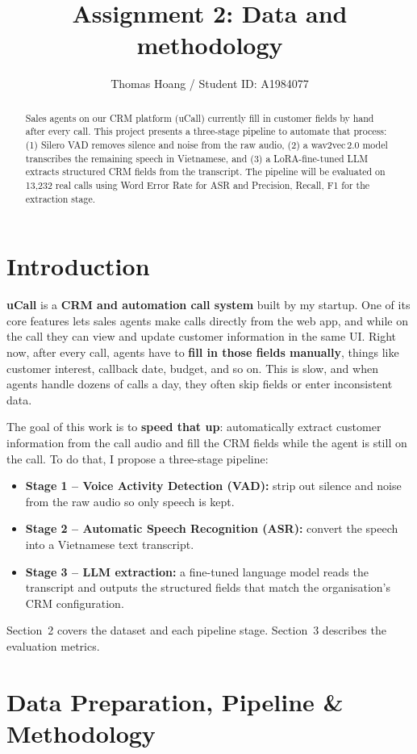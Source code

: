 \documentclass[ 
  journal=medium,
  manuscript={Contextual Information Extraction of Customer Data from Sales audio calls},
  year=2026,
  volume=0,
]{cup-journal}
\title{Assignment 2: Data and methodology}
\author{Thomas Hoang / Student ID: A1984077}
\begin{document}
\begin{abstract}
  Sales agents on our CRM platform (uCall) currently fill in customer fields by hand after every call. This project presents a three-stage pipeline to automate that process: (1) Silero VAD removes silence and noise from the raw audio, (2) a wav2vec\,2.0 model transcribes the remaining speech in Vietnamese, and (3) a LoRA-fine-tuned LLM extracts structured CRM fields from the transcript. The pipeline will be evaluated on 13{,}232 real calls using Word Error Rate for ASR and Precision, Recall, F1 for the extraction stage.
\end{abstract}

\section{Introduction}

\textbf{uCall} is a \textbf{CRM and automation call system} built by my startup. One of its core features lets sales agents make calls directly from the web app, and while on the call they can view and update customer information in the same UI. Right now, after every call, agents have to \textbf{fill in those fields manually}, things like customer interest, callback date, budget, and so on. This is slow, and when agents handle dozens of calls a day, they often skip fields or enter inconsistent data.

The goal of this work is to \textbf{speed that up}: automatically extract customer information from the call audio and fill the CRM fields while the agent is still on the call. To do that, I propose a three-stage pipeline:
\begin{itemize}
  \item \textbf{Stage 1 -- Voice Activity Detection (VAD):} strip out silence and noise from the raw audio so only speech is kept.
  \item \textbf{Stage 2 -- Automatic Speech Recognition (ASR):} convert the speech into a Vietnamese text transcript.
  \item \textbf{Stage 3 -- LLM extraction:} a fine-tuned language model reads the transcript and outputs the structured fields that match the organisation's CRM configuration.
\end{itemize}
Section~2 covers the dataset and each pipeline stage. Section~3 describes the evaluation metrics.


\section{Data Preparation, Pipeline \& Methodology}
\end{document}
